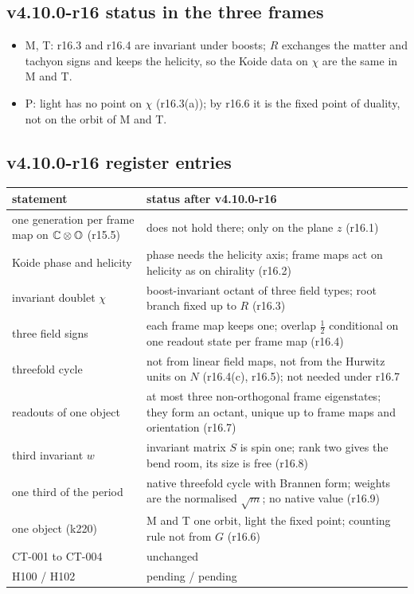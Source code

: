 \subsection*{v4.10.0-r16 status in the three frames}
\label{subsec:v4100-r16-frames}

\begin{itemize}[leftmargin=2em]
\item M, T: r16.3 and r16.4 are invariant under boosts; \(R\) exchanges the matter and tachyon signs and keeps the helicity,
so the Koide data on \(\chi\) are the same in M and T.
\item P: light has no point on \(\chi\) (r16.3(a)); by r16.6 it is the fixed point of duality, not on the orbit of M and T.
\end{itemize}

\subsection*{v4.10.0-r16 register entries}
\label{subsec:v4100-r16-register}

\begin{center}
\small
\begin{tabular}{@{}>{\raggedright\arraybackslash}p{}>{\raggedright\arraybackslash}p{}@{}}
\toprule
statement & status after v4.10.0-r16\\
\midrule
one generation per frame map on \(\mathbb C\otimes\mathbb{O}\) (r15.5) & does not hold there; only on the plane \(z\) (r16.1)\\
Koide phase and helicity & phase needs the helicity axis; frame maps act on helicity as on chirality (r16.2)\\
invariant doublet \(\chi\) & boost-invariant octant of three field types; root branch fixed up to \(R\) (r16.3)\\
three field signs & each frame map keeps one; overlap \(\tfrac12\) conditional on one readout state per frame map (r16.4)\\
threefold cycle & not from linear field maps, not from the Hurwitz units on \(N\) (r16.4(c), r16.5); not needed under r16.7\\
readouts of one object & at most three non-orthogonal frame eigenstates; they form an octant, unique up to frame maps and orientation (r16.7)\\
third invariant \(w\) & invariant matrix \(S\) is spin one; rank two gives the bend room, its size is free (r16.8)\\
one third of the period & native threefold cycle with Brannen form; weights are the normalised \(\sqrt m\); no native value (r16.9)\\
one object (k220) & M and T one orbit, light the fixed point; counting rule not from \(G\) (r16.6)\\
CT-001 to CT-004 & unchanged\\
H100 / H102 & pending / pending\\
\bottomrule
\end{tabular}
\end{center}

